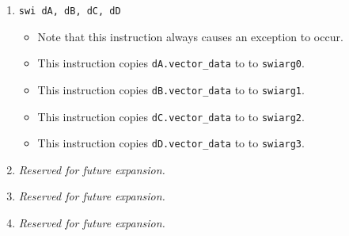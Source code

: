 \documentclass{article}
\begin{document}
\begin{itemize}
\begin{enumerate}
			\item \texttt{swi dA, dB, dC, dD}
				\begin{itemize}
				\item Note that this instruction always causes an exception
					to occur.
				\item This instruction copies \texttt{dA.vector\_data} to
					to \texttt{swiarg0}.
				\item This instruction copies \texttt{dB.vector\_data} to
					to \texttt{swiarg1}.
				\item This instruction copies \texttt{dC.vector\_data} to
					to \texttt{swiarg2}.
				\item This instruction copies \texttt{dD.vector\_data} to
					to \texttt{swiarg3}.
				\end{itemize}
			\item \textit{Reserved for future expansion.}
			\item \textit{Reserved for future expansion.}
			\item \textit{Reserved for future expansion.}
			\end{enumerate}
		\end{itemize}
		\newpage
\end{document}
